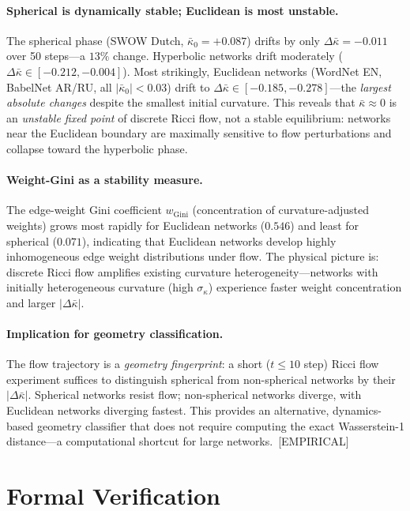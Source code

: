 \documentclass[11pt,a4paper]{article}
\newcommand{\kbar}{\bar{\kappa}}
\begin{document}
\paragraph{Spherical is dynamically stable; Euclidean is most unstable.}
The spherical phase (SWOW Dutch, $\kbar_0 = +0.087$) drifts by only $\Delta\kbar = -0.011$ over 50 steps---a $13\%$ change. Hyperbolic networks drift moderately ($\Delta\kbar \in [-0.212, -0.004]$). Most strikingly, Euclidean networks (WordNet EN, BabelNet AR/RU, all $|\kbar_0| < 0.03$) drift to $\Delta\kbar \in [-0.185, -0.278]$---the \emph{largest absolute changes} despite the smallest initial curvature. This reveals that $\kbar \approx 0$ is an \emph{unstable fixed point} of discrete Ricci flow, not a stable equilibrium: networks near the Euclidean boundary are maximally sensitive to flow perturbations and collapse toward the hyperbolic phase.

\paragraph{Weight-Gini as a stability measure.}
The edge-weight Gini coefficient $w_{\text{Gini}}$ (concentration of curvature-adjusted weights) grows most rapidly for Euclidean networks ($0.546$) and least for spherical ($0.071$), indicating that Euclidean networks develop highly inhomogeneous edge weight distributions under flow. The physical picture is: discrete Ricci flow amplifies existing curvature heterogeneity---networks with initially heterogeneous curvature (high $\sigma_\kappa$) experience faster weight concentration and larger $|\Delta\kbar|$.

\paragraph{Implication for geometry classification.}
The flow trajectory is a \emph{geometry fingerprint}: a short ($t \leq 10$ step) Ricci flow experiment suffices to distinguish spherical from non-spherical networks by their $|\Delta\kbar|$. Spherical networks resist flow; non-spherical networks diverge, with Euclidean networks diverging fastest. This provides an alternative, dynamics-based geometry classifier that does not require computing the exact Wasserstein-1 distance---a computational shortcut for large networks.~[EMPIRICAL]

\section{Formal Verification}
\label{sec:lean}
\end{document}
